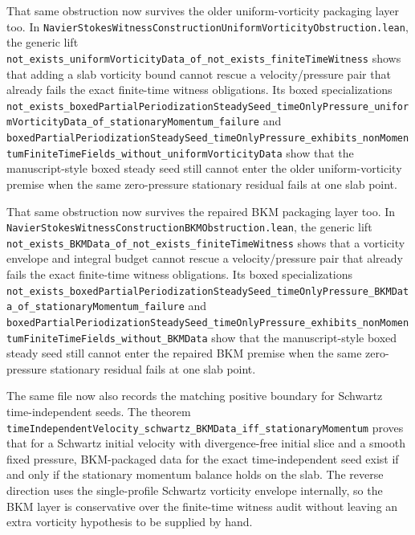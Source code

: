 \documentclass[11pt]{article}
\theoremstyle{remark}
\begin{document}
That same obstruction now survives the older uniform-vorticity packaging layer
too.  In
\texttt{NavierStokesWitnessConstructionUniformVorticityObstruction.lean}, the
generic lift
\texttt{not\_exists\_uniformVorticityData\_of\_not\_exists\_finiteTimeWitness}
shows that adding a slab vorticity bound cannot rescue a velocity/pressure pair
that already fails the exact finite-time witness obligations.  Its boxed
specializations
\texttt{not\_exists\_boxedPartialPeriodizationSteadySeed\_timeOnlyPressure\_uniformVorticityData\_of\_stationaryMomentum\_failure}
and
\texttt{boxedPartialPeriodizationSteadySeed\_timeOnlyPressure\_exhibits\_nonMomentumFiniteTimeFields\_without\_uniformVorticityData}
show that the manuscript-style boxed steady seed still cannot enter the older
uniform-vorticity premise when the same zero-pressure stationary residual fails
at one slab point.

That same obstruction now survives the repaired BKM packaging layer too.  In
\texttt{NavierStokesWitnessConstructionBKMObstruction.lean}, the generic lift
\texttt{not\_exists\_BKMData\_of\_not\_exists\_finiteTimeWitness} shows that a
vorticity envelope and integral budget cannot rescue a velocity/pressure pair
that already fails the exact finite-time witness obligations.  Its boxed
specializations
\texttt{not\_exists\_boxedPartialPeriodizationSteadySeed\_timeOnlyPressure\_BKMData\_of\_stationaryMomentum\_failure}
and
\texttt{boxedPartialPeriodizationSteadySeed\_timeOnlyPressure\_exhibits\_nonMomentumFiniteTimeFields\_without\_BKMData}
show that the manuscript-style boxed steady seed still cannot enter the
repaired BKM premise when the same zero-pressure stationary residual fails at
one slab point.

The same file now also records the matching positive boundary for Schwartz
time-independent seeds.  The theorem
\texttt{timeIndependentVelocity\_schwartz\_BKMData\_iff\_stationaryMomentum}
proves that for a Schwartz initial velocity with divergence-free initial slice
and a smooth fixed pressure, BKM-packaged data for the exact
time-independent seed exist if and only if the stationary momentum balance
holds on the slab.  The reverse direction uses the single-profile Schwartz
vorticity envelope internally, so the BKM layer is conservative over the
finite-time witness audit without leaving an extra vorticity hypothesis to be
supplied by hand.
\end{document}
